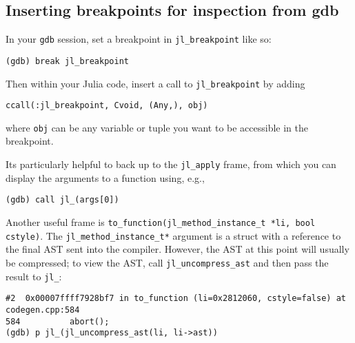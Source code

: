 \hypertarget{1392415358123037898}{}


\subsection{Inserting breakpoints for inspection from gdb}



In your \texttt{gdb} session, set a breakpoint in \texttt{jl\_breakpoint} like so:




\begin{lstlisting}
(gdb) break jl_breakpoint
\end{lstlisting}



Then within your Julia code, insert a call to \texttt{jl\_breakpoint} by adding




\begin{verbatim}
ccall(:jl_breakpoint, Cvoid, (Any,), obj)
\end{verbatim}



where \texttt{obj} can be any variable or tuple you want to be accessible in the breakpoint.



It{\textquotesingle}s particularly helpful to back up to the \texttt{jl\_apply} frame, from which you can display the arguments to a function using, e.g.,




\begin{lstlisting}
(gdb) call jl_(args[0])
\end{lstlisting}



Another useful frame is \texttt{to\_function(jl\_method\_instance\_t *li, bool cstyle)}. The \texttt{jl\_method\_instance\_t*} argument is a struct with a reference to the final AST sent into the compiler. However, the AST at this point will usually be compressed; to view the AST, call \texttt{jl\_uncompress\_ast} and then pass the result to \texttt{jl\_}:




\begin{lstlisting}
#2  0x00007ffff7928bf7 in to_function (li=0x2812060, cstyle=false) at codegen.cpp:584
584          abort();
(gdb) p jl_(jl_uncompress_ast(li, li->ast))
\end{lstlisting}



